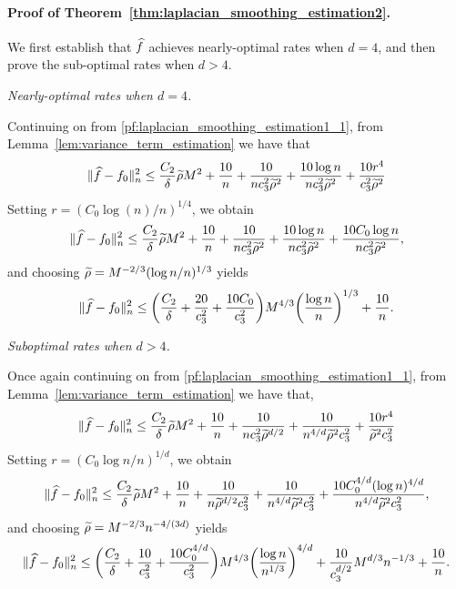 \paragraph{Proof of Theorem~\ref{thm:laplacian_smoothing_estimation2}.}
We first establish that $\widehat{f}$ achieves nearly-optimal rates when $d = 4$, and then prove the sub-optimal rates when $d > 4$.

\textit{Nearly-optimal rates when $d = 4$.}

Continuing on from \eqref{pf:laplacian_smoothing_estimation1_1}, from Lemma~\ref{lem:variance_term_estimation} we have that
\begin{equation*}
\|\widehat{f} - f_0\|_n^2 \leq \frac{C_2}{\delta} \widetilde{\rho} M^2 + \frac{10}{n} +  \frac{10}{nc_3^2\widetilde{\rho}^2} +  \frac{10 \log n}{nc_3^2\widetilde{\rho}^2} + \frac{10r^4}{c_3^2\widetilde{\rho}^2}
\end{equation*}
Setting $r = (C_0\log(n)/n)^{1/4}$, we obtain
\begin{equation*}
\|\widehat{f} - f_0\|_n^2 \leq \frac{C_2}{\delta} \widetilde{\rho} M^2 + \frac{10}{n} +  \frac{10}{nc_3^2\widetilde{\rho}^2} +  \frac{10 \log n}{nc_3^2\widetilde{\rho}^2} + \frac{10C_0\log n}{nc_3^2\widetilde{\rho}^2},
\end{equation*}
and choosing $\widetilde{\rho} = M^{-2/3}(\log n/n)^{1/3}$ yields
\begin{equation*}
\|\widehat{f} - f_0\|_n^2 \leq \biggl(\frac{C_2}{\delta} + \frac{20}{c_3^2} + \frac{10C_0}{c_3^2}\biggr) M^{4/3} \biggl(\frac{\log n}{n}\biggr)^{1/3} + \frac{10}{n}.
\end{equation*}

\textit{Suboptimal rates when $d > 4$.}

Once again continuing on from \eqref{pf:laplacian_smoothing_estimation1_1}, from Lemma~\ref{lem:variance_term_estimation} we have that,
\begin{equation*}
\|\widehat{f} - f_0\|_n^2 \leq \frac{C_2}{\delta} \widetilde{\rho} M^2 + \frac{10}{n} + \frac{10}{nc_3^{2}\widetilde{\rho}^{d/2}} +  \frac{10}{n^{4/d}\widetilde{\rho}^2c_3^2} + \frac{10r^4}{\widetilde{\rho}^2c_3^2}
\end{equation*}
Setting $r = (C_0\log n/n)^{1/d}$, we obtain
\begin{equation*}
\|\widehat{f} - f_0\|_n^2 \leq \frac{C_2}{\delta} \widetilde{\rho} M^2 + \frac{10}{n} + \frac{10}{n\widetilde{\rho}^{d/2}c_3^{2}} +  \frac{10}{n^{4/d}\widetilde{\rho}^2c_3^2} + \frac{10C_0^{4/d}(\log n)^{4/d}}{n^{4/d}\widetilde{\rho}^2c_3^2},
\end{equation*}
and choosing $\widetilde{\rho} = M^{-2/3}n^{-4/(3d)}$ yields
\begin{equation*}
\|\widehat{f} - f_0\|_n^2 \leq \biggl(\frac{C_2}{\delta} + \frac{10}{c_3^2} + \frac{10C_0^{4/d}}{c_3^2}\biggr)M^{4/3}\biggl(\frac{\log n}{n^{1/3}}\biggr)^{4/d} + \frac{10}{c_3^{d/2}}M^{d/3}n^{-1/3} + \frac{10}{n}.
\end{equation*}

